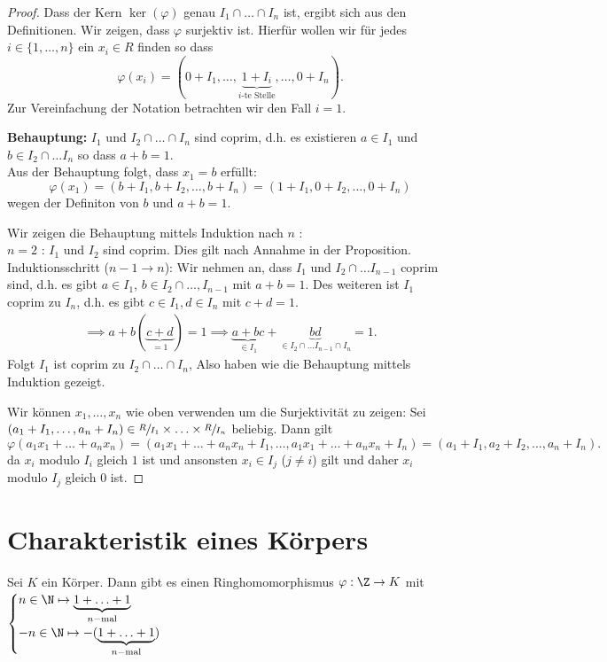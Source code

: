 \begin{proof}
	Dass der Kern $\ker(\varphi)$ genau $I_1 \cap \ldots \cap I_{n}$ ist, ergibt sich aus den Definitionen.
	Wir zeigen, dass $ \varphi$ surjektiv ist.
	Hierfür wollen wir für jedes $i \in \{1,\ldots,n\} $ ein $x_{i} \in R$ finden so dass
	\[
		\varphi(x_{i}) = (0+I_{1},\ldots,\underbrace{1+I_{i}}_{i\text{-te Stelle}},\ldots, 0+I_{n})
	.\] 
	Zur Vereinfachung der Notation betrachten wir den Fall $i = 1$.

	\textbf{Behauptung:} $I_1$ und $I_2 \cap \ldots \cap I_{n}$ sind coprim, d.h. es existieren $a \in I_1$ und $b \in I_2 \cap \ldots I_{n}$ so dass $a+b = 1$.\\
	Aus der Behauptung folgt, dass $x_1 = b$ erfüllt:
	\[
		\varphi(x_1) = (b + I_1, b+I_2,\ldots,b+I_{n}) = (1+ I_1, 0 + I_2, \ldots, 0+I_{n})
	\] 
	wegen der Definiton von $b$ und $a + b = 1$.

	Wir zeigen die Behauptung mittels Induktion nach $n$ :\\
	$n=2$ : $I_1$ und $I_2$ sind coprim. Dies gilt nach Annahme in der Proposition.\\
	Induktionsschritt ($n-1 \to n$): Wir nehmen an, dass $I_1$ und $I_2 \cap \ldots I_{n-1}$ coprim sind, d.h. es gibt
	$a \in I_1$, $b \in I_2 \cap \ldots, I_{n-1}$ mit $a+b = 1$.
	Des weiteren ist $I_1$ coprim zu $I_{n}$, d.h. es gibt $c \in I_1, d \in I_{n}$ mit $c+d=1$.
	\begin{align*}
		\implies a+b (\underbrace{c+d}_{=1}) = 1 \implies \underbrace{a+bc}_{\in I_1} + \underbrace{bd}_{\in I_2 \cap \ldots I_{n-1} \cap I_{n}} = 1
	.\end{align*}
	Folgt $I_1$ ist coprim zu $I_2 \cap \ldots \cap I_{n}$,
	Also haben wie die Behauptung mittels Induktion gezeigt.

	Wir können $x_1,\ldots,x_{n}$ wie oben verwenden um die Surjektivität zu zeigen:
	Sei $(a_1 + I_1,\ldots,a_{n} + I_{n}) \in \sfrac{R}{I_1} \times \ldots \times \sfrac{R}{I_{n}}$ beliebig.
	Dann gilt
	\[
		\varphi(a_1 x_1 + \ldots + a_{n} x_{n}) = (a_1 x_1 + \ldots + a_{n} x_{n} + I_1, \ldots, a_1 x_1 + \ldots + a_{n} x_{n} + I_{n})
		= (a_1 + I_1, a_2 + I_2,\ldots,a_{n} + I_{n})
	.\] 
	da $x_i$ modulo $I_i$ gleich $1$ ist und ansonsten $x_{i} \in I_{j}$ ($j \neq i$) gilt und daher $x_{i}$ modulo $I_{j}$ gleich $0$ ist.
\end{proof}

\section{Charakteristik eines Körpers}
Sei $K$ ein Körper. Dann gibt es einen Ringhomomorphismus $ \varphi: \Z \to K$ mit $\begin{cases}
	n \in \N \mapsto \underbrace{1+\ldots+1}_{n-\text{mal}}\\
	-n \in \N \mapsto -(\underbrace{1+\ldots+1}_{n-\text{mal}})
\end{cases}$

